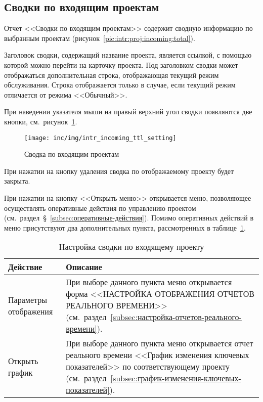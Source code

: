 \subsection{Сводки по входящим проектам}

Отчет <<Сводки по входящим проектам>> содержит сводную информацию по выбранным проектам (рисунок~\ref{pic:intr:proj:incoming:total}).

Заголовок сводки, содержащий название проекта, является ссылкой, с помощью которой можно перейти на карточку проекта.
Под заголовком сводки может отображаться дополнительная строка, отображающая текущий режим обслуживания.
Строка отображается только в случае, если текущий режим отличается от режима <<Обычный>>.

При наведении указателя мыши на правый верхний угол сводки появляются две кнопки, см.~рисунок~\ref{pic:intr:proj:incoming:total:setting}.

\begin{figure}[ht]
    \centering
    \texttt{[image: inc/img/intr\_incoming\_ttl\_setting]}
    \caption{Сводка по входящим проектам}
    \label{pic:intr:proj:incoming:total:setting}
\end{figure}

При нажатии на кнопку удаления сводка по отображаемому проекту будет закрыта.

При нажатии на кнопку <<Открыть меню>> открывается меню, позволяющее осуществлять оперативные действия по управлению проектом (см.~раздел~\S~\ref{subsec:оперативные-действия}).
Помимо оперативных действий в меню присутствуют два дополнительных пункта, рассмотренных в таблице~\ref{tab:prj:incoming:ttl:setting}.

\begin{table}[ht]
    \caption{Настройка сводки по входящему проекту}
    \begin{small}
        \begin{tabular}{|p{}|p{}|}
            \hline
            Действие & Описание \\
            \hline
            Параметры отображения & При выборе данного пункта меню открывается форма <<НАСТРОЙКА ОТОБРАЖЕНИЯ ОТЧЕТОВ РЕАЛЬНОГО ВРЕМЕНИ>> (см.~раздел~\ref{subsec:настройка-отчетов-реального-времени}).\\
            \hline
            Открыть график & При выборе данного пункта меню открывается отчет реального времени <<График изменения ключевых показателей>> по соответствующему проекту (см.~раздел~\ref{subsec:график-изменения-ключевых-показателей}).\\
            \hline
        \end{tabular}
    \end{small}
    \label{tab:prj:incoming:ttl:setting}
\end{table}

